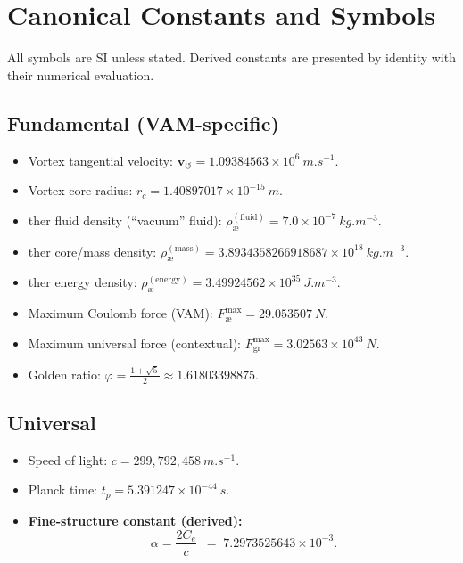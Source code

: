\documentclass[11pt,a4paper]{article}
\newcommand{\aeether}{\text{\ae}} %
\begin{document}
    \section{Canonical Constants and Symbols}
    All symbols are SI unless stated. Derived constants are presented by identity with their numerical evaluation.
    \subsection{Fundamental (VAM-specific)}
    \begin{itemize}
        \item Vortex tangential velocity: $\mathbf{v}_{\scriptscriptstyle\boldsymbol{\circlearrowleft}} = 1.09384563\times 10^{6}\ \si{m.s^{-1}}$.
        \item Vortex-core radius: $r_c = 1.40897017\times 10^{-15}\ \si{m}$.
        \item \aeether{}ther fluid density (``vacuum'' fluid): $\rho_{\aeether}^{(\mathrm{fluid})} = 7.0\times 10^{-7}\ \si{kg.m^{-3}}$.
        \item \aeether{}ther core/mass density: $\rho_{\aeether}^{(\mathrm{mass})} = 3.8934358266918687\times 10^{18}\ \si{kg.m^{-3}}$.
        \item \aeether{}ther energy density: $\rho_{\aeether}^{(\mathrm{energy})} = 3.49924562\times 10^{35}\ \si{J.m^{-3}}$.
        \item Maximum Coulomb force (VAM): $F_{\aeether}^{\max} = 29.053507\ \si{N}$.
        \item Maximum universal force (contextual): $F_{\mathrm{gr}}^{\max} = 3.02563\times 10^{43}\ \si{N}$.
        \item Golden ratio: $\varphi = \frac{1+\sqrt{5}}{2} \approx 1.61803398875$.
    \end{itemize}
    \subsection{Universal}
    \begin{itemize}
        \item Speed of light: $c = 299{,}792{,}458\ \si{m.s^{-1}}$.
        \item Planck time: $t_p = 5.391247\times 10^{-44}\ \si{s}$.
        \item \textbf{Fine-structure constant (derived):}
        \[
            \boxed{\ \alpha = \frac{2C_e}{c}\ } \;=\; 7.2973525643\times 10^{-3}.
        \]
    \end{itemize}
\end{document}
